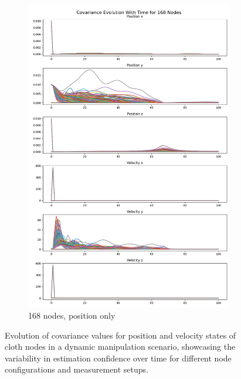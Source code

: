 \documentclass[subscriptcorrection,upint,varvw,barcolor=Goldenrod3,mathalfa=cal=euler,balance,hyphenate,french,pdf-a, nofoot]{asmejour} %
\begin{document}
\begin{figure}[ht]
\begin{subfigure}[b]{0.32\linewidth}
        \includegraphics[width=\linewidth]{CLOTH REPORT PICS/covariance 168.jpg}
        \caption{168 nodes, position only}
        \label{fig:covariance-168}
    \end{subfigure}
    \caption{Evolution of covariance values for position and velocity states of cloth nodes in a dynamic manipulation scenario, showcasing the variability in estimation confidence over time for different node configurations and measurement setups.}
    \label{fig:covariances}
\end{figure}

\end{document}
